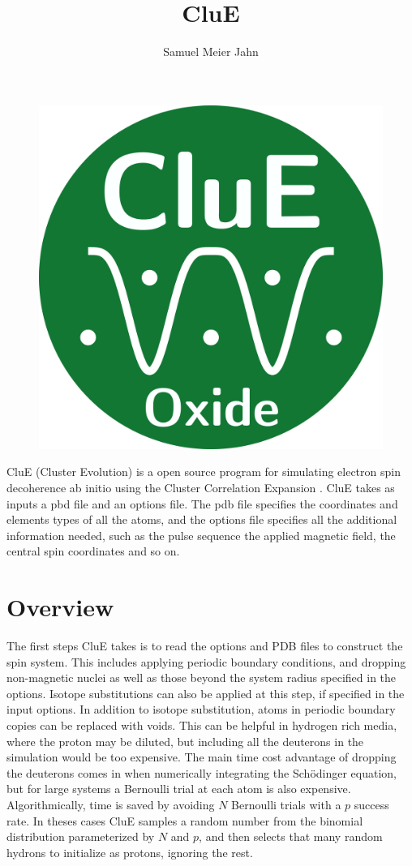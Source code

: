 \documentclass{book}
\title{CluE}
\author{Samuel Meier Jahn}
\begin{document}
%
\begin{figure} [H]
	\centering
	\includegraphics[width=0.5\linewidth]{figs/fig_CluE_Oxide_logo.png}
  \label{fig:clue_logo}
\end{figure}
%
CluE (Cluster Evolution) is a open source program for simulating electron spin 
decoherence ab initio using the Cluster Correlation Expansion 
\cite{2008_Yang_Liu,2009_Yang_Liu}.  
CluE takes as inputs a pbd file and an options file.
The pdb file specifies the coordinates and elements types of all the atoms, 
and the options file specifies all the additional information needed, 
such as the pulse sequence the applied magnetic field, the central spin
coordinates and so on.
\section{Overview}
The first steps CluE takes is to read the options and PDB files to construct
the spin system.  This includes applying periodic boundary conditions, and
dropping non-magnetic nuclei as well as those beyond the system radius 
specified in the options.  Isotope substitutions can also be applied at this
step, if specified in the input options.  In addition to isotope substitution,
atoms in periodic boundary copies can be replaced with voids.  
This can be helpful in hydrogen rich media,
where the proton may be diluted, but including all the deuterons in the
simulation would be too expensive.  The main time cost advantage of dropping 
the deuterons comes in when numerically integrating the Sch{\"o}dinger 
equation, but for large systems a Bernoulli trial at each atom is also
expensive.  Algorithmically, time is saved by avoiding $N$ Bernoulli trials
with a $p$ success rate.  In theses cases CluE samples a random
number from the binomial distribution parameterized by $N$ and $p$, and then 
selects that many random hydrons to initialize as protons, ignoring the rest.     
\end{document}
